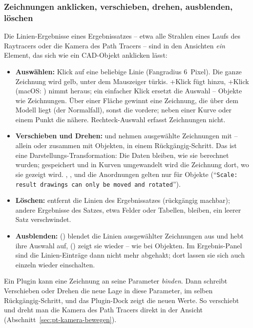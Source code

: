 \subsubsection{Zeichnungen anklicken, verschieben, drehen, ausblenden, löschen}\label{sec:ergebnis-zeichnungen}

Die Linien-Ergebnisse eines Ergebnissatzes -- etwa alle Strahlen eines Laufs des Raytracers oder
die Kamera des Path Tracers -- sind in den Ansichten \emph{ein} Element, das sich wie ein
CAD-Objekt anklicken lässt:

\begin{itemize}
  \item \textbf{Auswählen:} Klick auf eine beliebige Linie (Fangradius 6~Pixel). Die ganze
    Zeichnung wird gelb, unter dem Mauszeiger türkis. +Klick fügt hinzu,
    +Klick (macOS: ) nimmt heraus; ein einfacher Klick ersetzt die Auswahl
    -- Objekte wie Zeichnungen. Über einer Fläche gewinnt eine Zeichnung, die über dem Modell
    liegt (der Normalfall), sonst die vordere; neben einer Kurve oder einem Punkt die nähere.
    Rechteck-Auswahl erfasst Zeichnungen nicht.
  \item \textbf{Verschieben und Drehen:}  und  nehmen ausgewählte
    Zeichnungen mit -- allein oder zusammen mit Objekten, in einem Rückgängig-Schritt. Das ist
    eine Darstellungs-Transformation: Die Daten bleiben, wie sie berechnet wurden; gespeichert
    und in Kurven umgewandelt wird die Zeichnung dort, wo sie gezeigt wird. ,
    ,  und die Anordnungen gelten nur für Objekte
    (\enquote{\texttt{Scale: result drawings can only be moved and rotated}}).
  \item \textbf{Löschen:}  entfernt die Linien des Ergebnissatzes (rückgängig
    machbar); andere Ergebnisse des Satzes, etwa Felder oder Tabellen, bleiben, ein leerer Satz
    verschwindet.
  \item \textbf{Ausblenden:}  () blendet die Linien ausgewählter Zeichnungen
    aus und hebt ihre Auswahl auf,  () zeigt sie wieder -- wie bei
    Objekten. Im Ergebnis-Panel sind die Linien-Einträge dann nicht mehr abgehakt; dort lassen
    sie sich auch einzeln wieder einschalten.
\end{itemize}

Ein Plugin kann eine Zeichnung an seine Parameter \emph{binden}. Dann schreibt Verschieben oder
Drehen die neue Lage in diese Parameter, im selben Rückgängig-Schritt, und das Plugin-Dock zeigt
die neuen Werte. So verschiebt und dreht man die Kamera des Path Tracers direkt in der Ansicht
(Abschnitt~\ref{sec:pt-kamera-bewegen}).

